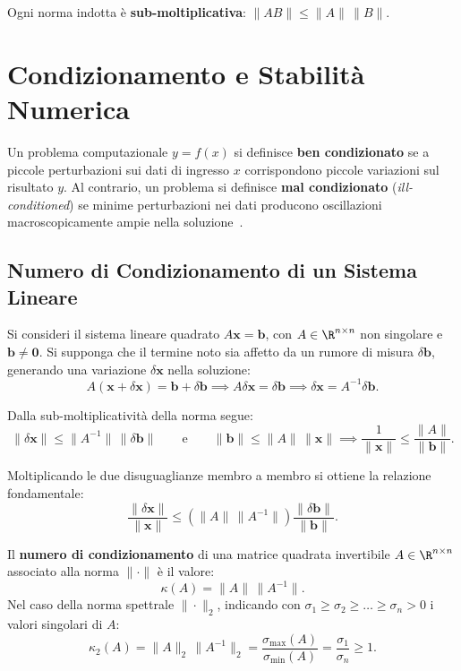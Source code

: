 Ogni norma indotta è \textbf{sub-moltiplicativa}: $\|A B\| \le \|A\| \, \|B\|$.

\FloatBarrier
\section{Condizionamento e Stabilità Numerica}

Un problema computazionale $y = f(x)$ si definisce \textbf{ben condizionato} se a piccole perturbazioni sui dati di ingresso $x$ corrispondono piccole variazioni sul risultato $y$. Al contrario, un problema si definisce \textbf{mal condizionato} (\textit{ill-conditioned}) se minime perturbazioni nei dati producono oscillazioni macroscopicamente ampie nella soluzione~\cite{golub2013matrix}.

\subsection{Numero di Condizionamento di un Sistema Lineare}

Si consideri il sistema lineare quadrato $A \mathbf{x} = \mathbf{b}$, con $A \in \R^{n \times n}$ non singolare e $\mathbf{b} \ne \mathbf{0}$. Si supponga che il termine noto sia affetto da un rumore di misura $\delta \mathbf{b}$, generando una variazione $\delta \mathbf{x}$ nella soluzione:
\begin{equation}
    A(\mathbf{x} + \delta \mathbf{x}) = \mathbf{b} + \delta \mathbf{b} \implies A \delta \mathbf{x} = \delta \mathbf{b} \implies \delta \mathbf{x} = A^{-1} \delta \mathbf{b}.
\end{equation}

Dalla sub-moltiplicatività della norma segue:
\begin{equation}
    \|\delta \mathbf{x}\| \le \|A^{-1}\| \, \|\delta \mathbf{b}\| \qquad \text{e} \qquad \|\mathbf{b}\| \le \|A\| \, \|\mathbf{x}\| \implies \frac{1}{\|\mathbf{x}\|} \le \frac{\|A\|}{\|\mathbf{b}\|}.
\end{equation}

Moltiplicando le due disuguaglianze membro a membro si ottiene la relazione fondamentale:
\begin{equation}
    \frac{\|\delta \mathbf{x}\|}{\|\mathbf{x}\|} \le \left(\|A\| \, \|A^{-1}\|\right) \frac{\|\delta \mathbf{b}\|}{\|\mathbf{b}\|}.
\end{equation}

\begin{definition}
Il \textbf{numero di condizionamento} di una matrice quadrata invertibile $A \in \R^{n \times n}$ associato alla norma $\|\cdot\|$ è il valore:
\begin{equation}
    \kappa(A) = \|A\| \, \|A^{-1}\|.
\end{equation}
Nel caso della norma spettrale $\|\cdot\|_2$, indicando con $\sigma_1 \ge \sigma_2 \ge \dots \ge \sigma_n > 0$ i valori singolari di $A$:
\begin{equation}
    \kappa_2(A) = \|A\|_2 \, \|A^{-1}\|_2 = \frac{\sigma_{\max}(A)}{\sigma_{\min}(A)} = \frac{\sigma_1}{\sigma_n} \ge 1.
\end{equation}
\end{definition}

